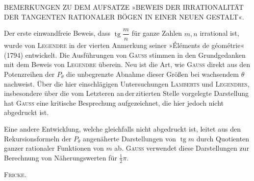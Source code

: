 
\begin{center}\small
BEMERKUNGEN ZU DEM AUFSATZE »BEWEIS DER IRRATIONALITÄT DER TANGENTEN
RATIONALER BÖGEN IN EINER NEUEN GESTALT«.
\end{center}
\par\noindent\hspace*{\parindent}Der erste einwandfreie Beweis, dass $\operatorname{tg}\dfrac{m}{n}$ für ganze Zahlen
$m, n$ irrational ist, wurde von \textsc{Legendre} in der vierten Anmerkung seiner »Éléments
de géométrie« (1794) entwickelt. Die Ausführungen von \textsc{Gauss} stimmen in den
Grundgedanken mit dem Beweis von \textsc{Legendre} überein. Neu ist die Art, wie
\textsc{Gauss} direkt aus den Potenzreihen der $P_\theta$ die unbegrenzte Abnahme dieser
Größen bei wachsendem $\theta$ nachweist. Über die hier einschlägigen
Untersuchungen \textsc{Lamberts} und \textsc{Legendres}, insbesondere über die vom
Letzteren an\,der\,zitierten Stelle vorgelegte Darstellung hat \textsc{Gauss} eine kritische
Besprechung aufgezeichnet, die hier jedoch nicht abgedruckt ist.

Eine andere Entwicklung, welche gleichfalls nicht abgedruckt ist, leitet aus den
Rekursionsformeln der $P_\theta$ angenäherte Darstellungen von $\operatorname{tg} m$
durch Quotienten ganzer rationaler Funktionen von $m$ ab. \textsc{Gauss} verwendet diese
Darstellungen zur Berechnung von Näherungswerten für $\tfrac{1}{2}\pi$.

\begin{flushright}
\textsc{Fricke}.
\end{flushright}
